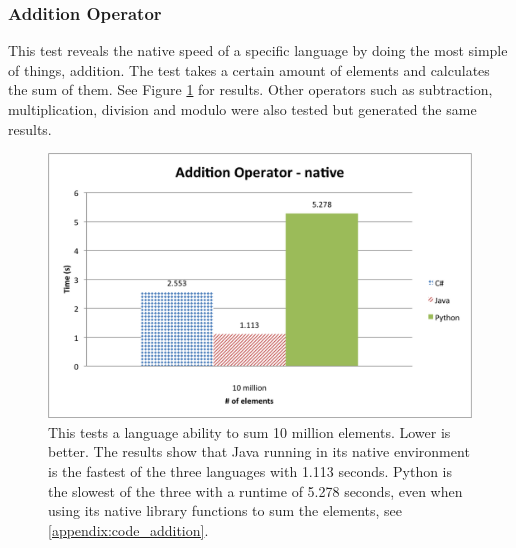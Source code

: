 \subsubsection{Addition Operator}

This test reveals the native speed of a specific language by doing the most simple of things, addition. The test takes a certain amount of elements and calculates the sum of them. See Figure \ref{fig:native_addition} for results. Other operators such as subtraction, multiplication, division and modulo were also tested but generated the same results.

\begin{figure}[h]
	\centering
	\includegraphics[width=1.0\linewidth]{chapters/new_media/AdditionOperatorNative.png}
	\caption{This tests a language ability to sum 10 million elements. Lower is better. The results show that Java running in its native environment is the fastest of the three languages with 1.113 seconds. Python is the slowest of the three with a runtime of 5.278 seconds, even when using its native library functions to sum the elements, see \ref{appendix:code_addition}.}
	\label{fig:native_addition}
\end{figure}
